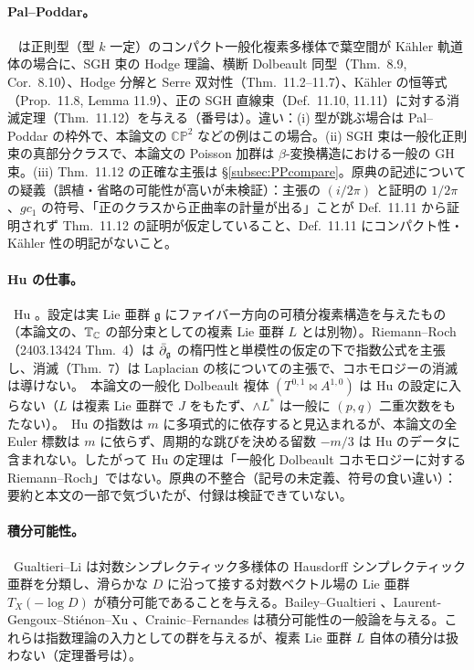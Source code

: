 \paragraph{Pal--Poddar。}\tC\ \cite{PP} は正則型（型 $k$ 一定）のコンパクト一般化複素多様体で葉空間が Kähler 軌道体の場合に、SGH 束の Hodge 理論、横断 Dolbeault 同型（Thm.\ 8.9, Cor.\ 8.10）、Hodge 分解と Serre 双対性（Thm.\ 11.2--11.7）、Kähler の恒等式（Prop.\ 11.8, Lemma 11.9）、正の SGH 直線束（Def.\ 11.10, 11.11）に対する消滅定理（Thm.\ 11.12）を与える（番号は\tQ）。違い：(i) 型が跳ぶ場合は Pal--Poddar の枠外で、本論文の $\mathbb{CP}^2$ などの例はこの場合。(ii) SGH 束は一般化正則束の真部分クラスで、本論文の Poisson 加群は $\beta$-変換構造における一般の GH 束。(iii) Thm.\ 11.12 の正確な主張は \S\ref{subsec:PPcompare}。原典の記述についての疑義（誤植・省略の可能性が高いが未検証\tQ）：主張の $(i/2\pi)$ と証明の $1/2\pi$、$gc_1$ の符号、「正のクラスから正曲率の計量が出る」ことが Def.\ 11.11 から証明されず Thm.\ 11.12 の証明が仮定していること、Def.\ 11.11 にコンパクト性・Kähler 性の明記がないこと。

\paragraph{Hu の仕事。}\tC\ Hu \cite{Hu1,Hu2}。設定は実 Lie 亜群 $\mathfrak g$ にファイバー方向の可積分複素構造を与えたもの（本論文の、$\mathbb T_\mathbb C$ の部分束としての複素 Lie 亜群 $L$ とは別物）。Riemann--Roch（2403.13424 Thm.\ 4）は $\bar\partial_{\mathfrak g}$ の楕円性と単模性の仮定の下で指数公式を主張し、消滅（Thm.\ 7）は Laplacian の核についての主張で、コホモロジーの消滅は導けない。\tP\ 本論文の一般化 Dolbeault 複体 $(T^{0,1}\bowtie A^{1,0})$ は Hu の設定に入らない（$L$ は複素 Lie 亜群で $J$ をもたず、$\wedge L^*$ は一般に $(p,q)$ 二重次数をもたない）。\tK\ Hu の指数は $m$ に多項式的に依存すると見込まれるが、本論文の全 Euler 標数は $m$ に依らず、周期的な跳びを決める留数 $-m/3$ は Hu のデータに含まれない。したがって Hu の定理は「一般化 Dolbeault コホモロジーに対する Riemann--Roch」ではない。原典の不整合（記号の未定義、符号の食い違い）：要約と本文の一部で気づいたが、付録は検証できていない\tQ。

\paragraph{積分可能性。}\tC\ Gualtieri--Li \cite{GL} は対数シンプレクティック多様体の Hausdorff シンプレクティック亜群を分類し、滑らかな $D$ に沿って接する対数ベクトル場の Lie 亜群 $T_X(-\log D)$ が積分可能であることを与える。Bailey--Gualtieri \cite{BG}、Laurent-Gengoux--Stiénon--Xu \cite{LGSX2}、Crainic--Fernandes \cite{CF} は積分可能性の一般論を与える。これらは指数理論の入力としての群を与えるが、複素 Lie 亜群 $L$ 自体の積分は扱わない（定理番号は\tQ）。

